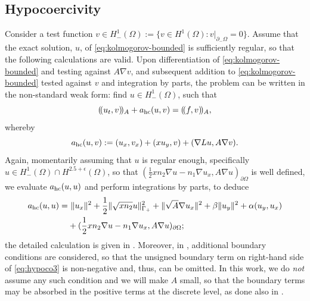 \documentclass{amsart}
\newcommand{\norm}[2]{\|{#1}\|_{{#2}}}
\newcommand{\Ainner}[2]{(\!({#1},{#2})\!)_A}
\theoremstyle{definition}
\theoremstyle{remark}
\numberwithin{equation}{section}
\begin{document}
\subsection*{Hypocoercivity}
Consider a test function $v\in H^1_{-}(\Omega):=\{v\in H^1(\Omega):v|_{\partial_{-}\Omega}=0\}$. Assume that the exact solution, $u$, of \eqref{eq:kolmogorov-bounded} is sufficiently regular, so that the following calculations are valid.
Upon differentiation of \eqref{eq:kolmogorov-bounded} and testing against $A\nabla v$, and subsequent addition to \eqref{eq:kolmogorov-bounded} tested against $v$ and integration by parts, the problem can be written in the non-standard weak form: find $u\in H^1_{-}(\Omega)$, such that
\begin{equation}\label{modified_weak_form}
	\Ainner{u_t}{v} + a_{\rm hc}(u,v) = \Ainner{f}{v},
\end{equation}
whereby
\begin{equation}\label{eq:spatial_part}
	a_{\rm hc}(u,v):=(u_x,v_x)+(xu_y,v)+(\nabla L u, A\nabla v).
	\end{equation}
	 {Again, momentarily assuming that $u$ is regular enough, specifically $u\in H^1_-(\Omega)\cap H^{2.5+\epsilon}(\Omega) $, so that  $(\frac{1}{2}xn_2\nabla u-n_1\nabla u_{x}, A\nabla u)_{\partial\Omega}$ is well defined, we evaluate $ {a_{\rm hc}(u,u)}$ and perform integrations by parts, to deduce}
\begin{equation}\label{eq:hypoco3}
	\begin{aligned}
		a_{\rm hc}(u,u)=&\ \norm{u_x}{}^2+\frac{1}{2}\norm{\sqrt{xn_2}u}{\Gamma_+}^2+\norm{\sqrt{A}\nabla u_x}{}^2+\beta\norm{u_y}{}^2+\alpha(u_y, u_x)\\
		&+(\frac{1}{2}xn_2\nabla u-n_1\nabla u_{x}, A\nabla u)_{\partial\Omega};
	\end{aligned}
\end{equation}
 {the detailed calculation is given in \cite{georgoulis}. Moreover, in }\cite{georgoulis}, additional boundary conditions are considered, so that the unsigned boundary term on right-hand side of \eqref{eq:hypoco3} is non-negative and, thus, can be omitted.  {In this work, we do \emph{not} assume any such condition and} we will make $A$ small, so that the boundary terms may be absorbed in the positive terms  {at the discrete level}, as done also in \cite{DonGeoHer24}.
\end{document}
